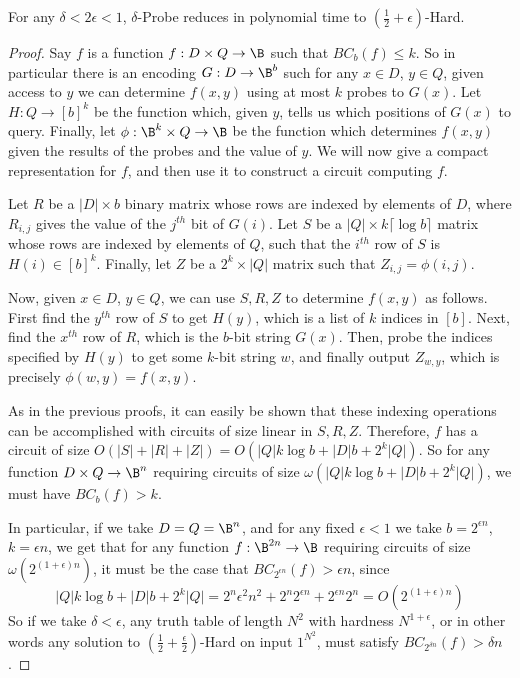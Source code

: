 \begin{theorem}\label{thm:probe-circuit}
For any $\delta < 2\epsilon < 1$, {\sc $\delta$-Probe} reduces in polynomial time to {\sc $(\frac{1}{2} + \epsilon)$-Hard}.
\end{theorem}
\begin{proof}

Say $f$ is a function $f: D \times Q \rightarrow \B$ such that $BC_b(f) \leq k$. So in particular there is an encoding $G: D \rightarrow \B^b$ such for any $x \in D$, $y \in Q$, given access to $y$ we can determine $f(x,y)$ using at most $k$ probes to $G(x)$. Let $H: Q \rightarrow [b]^k$ be the function which, given $y$, tells us which positions of $G(x)$ to query. Finally, let $\phi: \B^k \times Q \rightarrow \B$ be the function which determines $f(x,y)$ given the results of the probes and the value of $y$. We will now give a compact representation for $f$, and then use it to construct a circuit computing $f$.

Let $R$ be a $|D| \times b$ binary matrix whose rows are indexed by elements of $D$, where $R_{i,j}$ gives the value of the $j^{th}$ bit of $G(i)$. Let $S$ be a $|Q| \times k \lceil \log b \rceil$ matrix whose rows are indexed by elements of $Q$, such that the $i^{th}$ row of $S$ is $H(i) \in [b]^k$. Finally, let $Z$ be a $2^k \times |Q|$ matrix such that $Z_{i,j} = \phi(i,j)$.

Now, given $x \in D$, $y \in Q$, we can use $S,R,Z$ to determine $f(x,y)$ as follows. First find the $y^{th}$ row of $S$ to get $H(y)$, which is a list of $k$ indices in $[b]$. Next, find the $x^{th}$ row of $R$, which is the $b$-bit string $G(x)$. Then, probe the indices specified by $H(y)$ to get some $k$-bit string $w$, and finally output $Z_{w, y}$, which is precisely $\phi(w,y) = f(x,y)$.

As in the previous proofs, it can easily be shown that these indexing operations can be accomplished with circuits of size linear in $S,R,Z$. Therefore, $f$ has a circuit of size $O(|S| + |R| + |Z|) = O(|Q|k\log b + |D|b + 2^k|Q|)$. So for any function $D \times Q \rightarrow \B^n$ requiring circuits of size $\omega(|Q|k\log b + |D|b + 2^k|Q|)$, we must have $BC_b(f) > k$.

In particular, if we take $D = Q = \B^n$, and for any fixed $\epsilon < 1$ we take $b= 2^{\epsilon n}$, $k = \epsilon n$, we get that for any function $f: \B^{2n} \rightarrow \B$ requiring circuits of size $\omega(2^{(1 +\epsilon) n})$, it must be the case that $BC_{2^{\epsilon n}}(f) > \epsilon n$, since
\[
|Q|k\log b + |D|b + 2^k|Q| = 2^n \epsilon^2 n^2 + 2^n2^{\epsilon n} + 2^{\epsilon n}2^n = O(2^{(1+\epsilon) n})
\]
So if we take $\delta < \epsilon$, any truth table of length $N^2$ with hardness $N^{1+\epsilon}$, or in other words any solution to {\sc $(\frac{1}{2} + \frac{\epsilon}{2})$-Hard} on input $1^{N^2}$, must satisfy $BC_{2^{\delta n}}(f) > \delta n$.
\end{proof}



